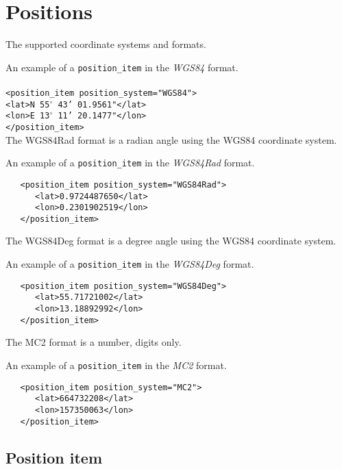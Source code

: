 \section{Positions}

The supported coordinate systems and formats.

An example of a \texttt{position\_item} in the \emph{WGS84} format.\\
~\\
\hspace*{6mm}\texttt{<position\_item position\_system="WGS84">}\\
\hspace*{12mm}\texttt{<lat>N 55$^{\circ}$ 43' 01.9561"</lat>}\\
\hspace*{12mm}\texttt{<lon>E 13$^{\circ}$ 11' 20.1477"</lon>}\\
\hspace*{6mm}\texttt{</position\_item>}\\

The WGS84Rad format is a radian angle using the WGS84 coordinate system.

An example of a \texttt{position\_item} in the \emph{WGS84Rad} format.
\begin{verbatim}
   <position_item position_system="WGS84Rad">
      <lat>0.9724487650</lat>
      <lon>0.2301902519</lon>
   </position_item>
\end{verbatim}

The WGS84Deg format is a degree angle using the WGS84 coordinate system.

An example of a \texttt{position\_item} in the \emph{WGS84Deg} format.
\begin{verbatim}
   <position_item position_system="WGS84Deg">
      <lat>55.71721002</lat>
      <lon>13.18892992</lon>
   </position_item>
\end{verbatim}

The MC2 format is a number, digits only.

An example of a \texttt{position\_item} in the \emph{MC2} format.
\begin{verbatim}
   <position_item position_system="MC2">
      <lat>664732208</lat>
      <lon>157350063</lon>
   </position_item>
\end{verbatim}


\subsection{Position item}


